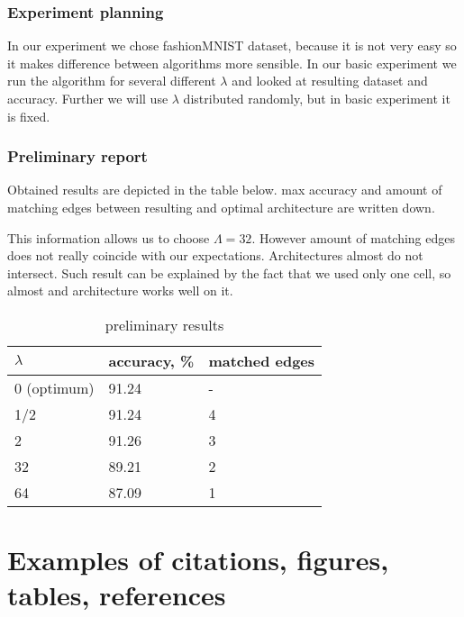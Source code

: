\documentclass{article}
\begin{document}
\subsubsection{Experiment planning}

In our experiment we chose fashionMNIST dataset, because it is not very easy so it makes difference between algorithms more sensible. In our basic experiment we run the algorithm for several different $\lambda$ and looked at resulting dataset and accuracy. Further we will use $\lambda$ distributed randomly, but in basic experiment it is fixed.

\subsubsection{Preliminary report}

Obtained results are depicted in the table below. max accuracy and amount of matching edges between resulting and optimal architecture are written down.

This information allows us to choose $\Lambda = 32$. However amount of matching edges does not really coincide with our expectations. Architectures almost do not intersect. Such result can be explained by the fact that we used only one cell, so almost and architecture works well on it.

\begin{table}[h   ]
	\caption{preliminary results}
	\centering
	\begin{tabular}{lll}

		\cmidrule(r){1-2}
		$\lambda$     & accuracy, \% & matched edges \\
		\midrule
        0 (optimum) & 91.24 & - \\ 
        1/2  & 91.24 &  4   \\
		2  & 91.26   &  3   \\
		32 & 89.21   &  2   \\
		64 & 87.09   &  1   \\
		\bottomrule
	\end{tabular}
	\label{tab:table}
\end{table}








\section{Examples of citations, figures, tables, references}
\label{sec:others}
\end{document}
